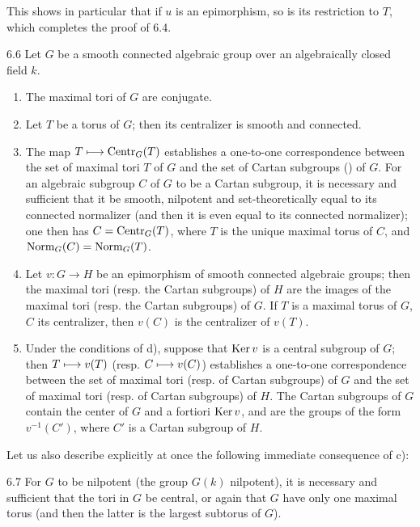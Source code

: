 This shows in particular that if $u$ is an epimorphism, so is its restriction to $T$, which completes the proof of 6.4.
\begin{theorem}{6.6}\label{XII.6.6}
Let $G$ be a smooth connected algebraic group over an algebraically closed field $k$.
\begin{enumerate}[label=\alph*)]
\item The maximal tori of $G$ are conjugate.
\item Let $T$ be a torus of $G$; then its centralizer is smooth and connected.
\item The map $T\longmapsto\operatorname{Centr}_G(T)$ establishes a one-to-one correspondence between the set of maximal tori $T$ of $G$ and the set of Cartan subgroups () of $G$. For an algebraic subgroup $C$ of $G$ to be a Cartan subgroup, it is necessary and sufficient that it be smooth, nilpotent and set-theoretically equal to its connected normalizer (and then it is even equal to its connected normalizer); one then has $C=\operatorname{Centr}_G(T)$, where $T$ is the unique maximal torus of $C$, and $\operatorname{Norm}_G(C)=\operatorname{Norm}_G(T)$.
\item Let $v:G\to H$ be an epimorphism of smooth connected algebraic groups; then the maximal tori (resp. the Cartan subgroups) of $H$ are the images of the maximal tori (resp. the Cartan subgroups) of $G$. If $T$ is a maximal torus of $G$, $C$ its centralizer, then $v(C)$ is the centralizer of $v(T)$.
\item Under the conditions of d), suppose that $\operatorname{Ker} v$ is a central subgroup of $G$; then $T\longmapsto v(T)$ (resp. $C\longmapsto v(C)$) establishes a one-to-one correspondence between the set of maximal tori (resp. of Cartan subgroups) of $G$ and the set of maximal tori (resp. of Cartan subgroups) of $H$. The Cartan subgroups of $G$ contain the center of $G$ and a fortiori $\operatorname{Ker} v$, and are the groups of the form $v^{-1}(C')$, where $C'$ is a Cartan subgroup of $H$.
\end{enumerate}
\end{theorem}
Let us also describe explicitly at once the following immediate consequence of c):
\begin{corollary}{6.7}\label{XII.6.7}
For $G$ to be nilpotent (\ie the group $G(k)$ nilpotent), it is necessary and sufficient that the tori in $G$ be central, or again that $G$ have only one maximal torus (and then the latter is the largest subtorus of $G$).
\end{corollary}
